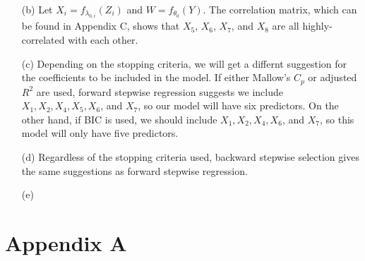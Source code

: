 \documentclass[10pt]{article}
\begin{document}
\begin{itemize}
    \item[(b)] Let \(X_i = f_{\lambda_{0,i}}(Z_i)\) and \(W = f_{\theta_0}(Y)\). The correlation matrix, which can be found in Appendix C, shows that 
    \(X_5\), \(X_6\), \(X_7\), and \(X_8\) are all highly-correlated with each other. 

    \item[(c)] Depending on the stopping criteria, we will get a differnt suggestion for the coefficients to be included in the model. If either Mallow's \(C_p\)
    or adjusted \(R^2\) are used, forward stepwise regression suggests we include \(X_1, X_2, X_4, X_5, X_6\), and \(X_7\), so our model will have six predictors.
    On the other hand, if BIC is used, we should include \(X_1, X_2, X_4, X_6\), and \(X_7\), so this model will only have five predictors.

    \item[(d)] Regardless of the stopping criteria used, backward stepwise selection gives the same suggestions as forward stepwise regression. 

    \item[(e)] 
\end{itemize}


\section{Appendix A} \noindent
\end{document}
